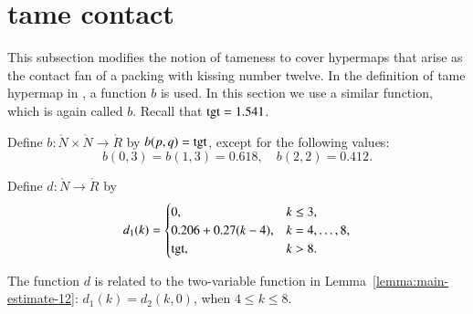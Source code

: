 \documentclass{llncs}
\def\op#1{{\hbox{#1}}}
\begin{document}
\section{tame contact}

This subsection modifies the notion of tameness to cover hypermaps
that arise as the contact fan of a packing with kissing number twelve.  In the
definition of tame hypermap in \cite{DSP}, a function $b$
is used.  In this section we use a similar function,  which is
again called $b$.   Recall that $\op{tgt}=1.541$.  %
%

\begin{definition}[b]
  Define $b:\ring{N}\times \ring{N}\to \ring{R}$ by
  $b\pqr{(p,q)}=\op{tgt}$, except for the following values:
\[
b(0,3)=b(1,3)=0.618,\quad b(2,2)=0.412.
\]
\end{definition}
%

\begin{definition}[d]
Define $d:\ring{N}\to \ring{R}$ by
\[d_1(k) = \begin{cases}
0, & k\le 3, \\
0.206 + 0.27 (k-4),& k=4,\ldots,8,\\
\op{tgt},& k>8.\\
\end{cases}
\]
\end{definition}
%

The function $d$ is related to the two-variable function in
Lemma~\ref{lemma:main-estimate-12}: $d_1(k) = d_2(k,0)$, when $4\le k\le
8$.
\end{document}
